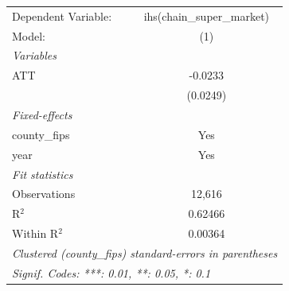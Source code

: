 
\begingroup
\centering
\begin{tabular}{lc}
   \tabularnewline \midrule \midrule
   Dependent Variable: & ihs(chain\_super\_market)\\    
   Model:              & (1)\\  
   \midrule
   \emph{Variables}\\
   ATT                 & -0.0233\\   
                       & (0.0249)\\   
   \midrule
   \emph{Fixed-effects}\\
   county\_fips        & Yes\\  
   year                & Yes\\  
   \midrule
   \emph{Fit statistics}\\
   Observations        & 12,616\\  
   R$^2$               & 0.62466\\  
   Within R$^2$        & 0.00364\\  
   \midrule \midrule
   \multicolumn{2}{l}{\emph{Clustered (county\_fips) standard-errors in parentheses}}\\
   \multicolumn{2}{l}{\emph{Signif. Codes: ***: 0.01, **: 0.05, *: 0.1}}\\
\end{tabular}
\par\endgroup


